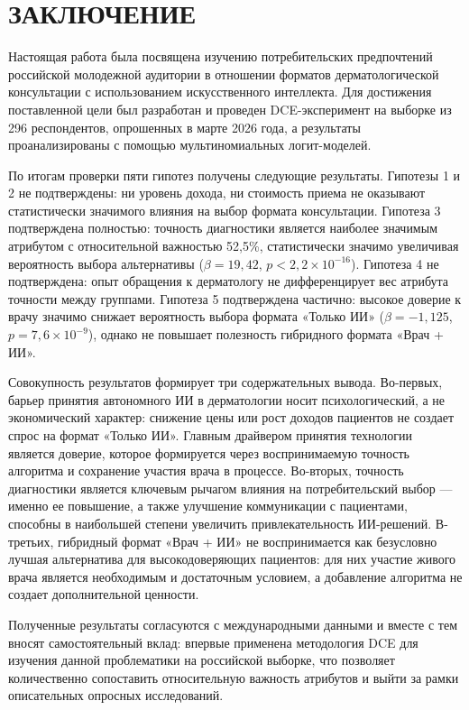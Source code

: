 \documentclass[12pt, a4paper]{article}
\begin{document}
\section{ЗАКЛЮЧЕНИЕ}
Настоящая работа была посвящена изучению потребительских предпочтений российской молодежной аудитории в отношении форматов дерматологической консультации с использованием искусственного интеллекта. Для достижения поставленной цели был разработан и проведен DCE-эксперимент на выборке из 296 респондентов, опрошенных в марте 2026 года, а результаты проанализированы с помощью мультиномиальных логит-моделей.

По итогам проверки пяти гипотез получены следующие результаты. Гипотезы 1 и 2 не подтверждены: ни уровень дохода, ни стоимость приема не оказывают статистически значимого влияния на выбор формата консультации. Гипотеза 3 подтверждена полностью: точность диагностики является наиболее значимым атрибутом с относительной важностью 52,5\%, статистически значимо увеличивая вероятность выбора альтернативы ($\beta = 19,42$, $p < 2,2\times10^{-16}$). Гипотеза 4 не подтверждена: опыт обращения к дерматологу не дифференцирует вес атрибута точности между группами. Гипотеза 5 подтверждена частично: высокое доверие к врачу значимо снижает вероятность выбора формата «Только ИИ» ($\beta = -1,125$, $p = 7,6\times10^{-9}$), однако не повышает полезность гибридного формата «Врач + ИИ».

Совокупность результатов формирует три содержательных вывода. Во-первых, барьер принятия автономного ИИ в дерматологии носит психологический, а не экономический характер: снижение цены или рост доходов пациентов не создает спрос на формат «Только ИИ». Главным драйвером принятия технологии является доверие, которое формируется через воспринимаемую точность алгоритма и сохранение участия врача в процессе. Во-вторых, точность диагностики является ключевым рычагом влияния на потребительский выбор --- именно ее повышение, а также улучшение коммуникации с пациентами, способны в наибольшей степени увеличить привлекательность ИИ-решений. В-третьих, гибридный формат «Врач + ИИ» не воспринимается как безусловно лучшая альтернатива для высокодоверяющих пациентов: для них участие живого врача является необходимым и достаточным условием, а добавление алгоритма не создает дополнительной ценности.

Полученные результаты согласуются с международными данными и вместе с тем вносят самостоятельный вклад: впервые применена методология DCE для изучения данной проблематики на российской выборке, что позволяет количественно сопоставить относительную важность атрибутов и выйти за рамки описательных опросных исследований.
\end{document}
